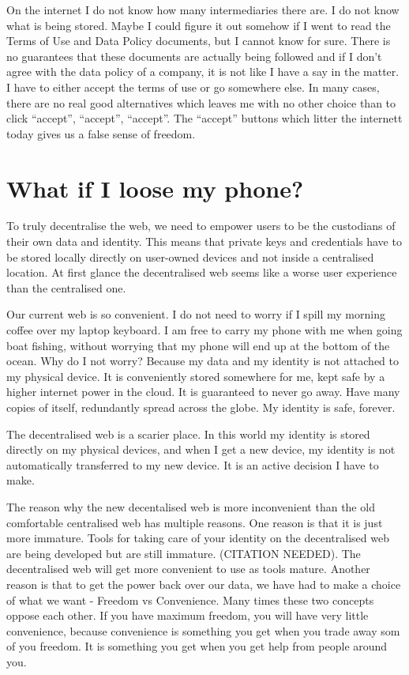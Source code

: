 On the internet I do not know how many intermediaries there are. I do
not know what is being stored. Maybe I could figure it out somehow if I
went to read the Terms of Use and Data Policy documents, but I cannot
know for sure. There is no guarantees that these documents are actually
being followed and if I don't agree with the data policy of a company,
it is not like I have a say in the matter. I have to either accept the
terms of use or go somewhere else. In many cases, there are no real good
alternatives which leaves me with no other choice than to click
``accept'', ``accept'', ``accept''. The ``accept'' buttons which litter
the internett today gives us a false sense of freedom.

\hypertarget{what-if-i-loose-my-phone}{%
\section{What if I loose my phone?}\label{what-if-i-loose-my-phone}}

To truly decentralise the web, we need to empower users to be the
custodians of their own data and identity. This means that private keys
and credentials have to be stored locally directly on user-owned devices
and not inside a centralised location. At first glance the decentralised
web seems like a worse user experience than the centralised one.

Our current web is so convenient. I do not need to worry if I spill my
morning coffee over my laptop keyboard. I am free to carry my phone with
me when going boat fishing, without worrying that my phone will end up
at the bottom of the ocean. Why do I not worry? Because my data and my
identity is not attached to my physical device. It is conveniently
stored somewhere for me, kept safe by a higher internet power in the
cloud. It is guaranteed to never go away. Have many copies of itself,
redundantly spread across the globe. My identity is safe, forever.

The decentralised web is a scarier place. In this world my identity is
stored directly on my physical devices, and when I get a new device, my
identity is not automatically transferred to my new device. It is an
active decision I have to make.

The reason why the new decentalised web is more inconvenient than the
old comfortable centralised web has multiple reasons. One reason is that
it is just more immature. Tools for taking care of your identity on the
decentralised web are being developed but are still immature. (CITATION
NEEDED). The decentralised web will get more convenient to use as tools
mature. Another reason is that to get the power back over our data, we
have had to make a choice of what we want - Freedom vs Convenience. Many
times these two concepts oppose each other. If you have maximum freedom,
you will have very little convenience, because convenience is something
you get when you trade away som of you freedom. It is something you get
when you get help from people around you.

